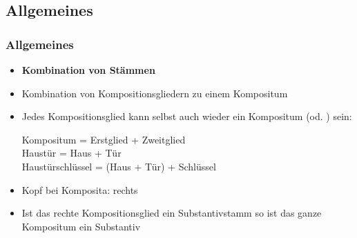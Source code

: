 \subsection{Allgemeines}
\begin{frame}
\frametitle{Allgemeines}

\begin{itemize}
	\item \textbf{Kombination von Stämmen}
	\item Kombination von Kompositionsgliedern zu einem Kompositum
	\item Jedes Kompositionsglied kann selbst auch wieder ein Kompositum (od. ) sein:
	
	\ea
	\glll Kompositum = Erstglied + Zweitglied \\
		Haustür = Haus + Tür \\
		Haustürschlüssel = {(Haus + Tür)} + Schlüssel\\
	\z
		 
	\item Kopf bei Komposita: rechts
	\item Ist das rechte Kompositionsglied ein Substantivstamm so ist das ganze Kompositum ein Substantiv
\end{itemize}


\end{frame}


